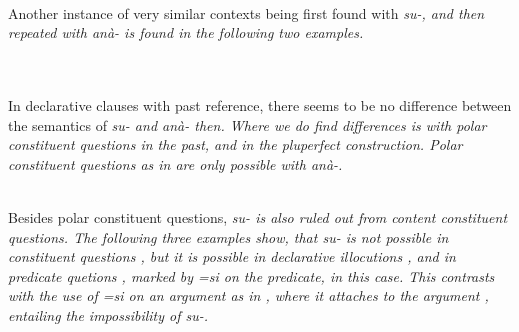  \\
Another instance of very similar contexts being  first found with \em su-\em, and then repeated with \em anà- \em is found in the following two examples.

 \\
 \\
In declarative clauses with past reference, there seems to be no difference between the semantics of \em su- \em and \em anà- \em then. Where we do find differences is with polar constituent questions in the past, and in the pluperfect construction. Polar constituent questions as in  are only possible with \em anà-\em.

\\

Besides polar constituent questions, \em su- \em is also ruled out from content constituent questions.
The following three examples show, that \em su- \em is not possible in constituent questions , but it is possible in declarative illocutions , and in predicate quetions , marked by \em =si \em on the predicate,  in this case. This contrasts with the use of \em =si \em on an argument as in , where it attaches to the argument , entailing the impossibility of \em su-\em.
 
